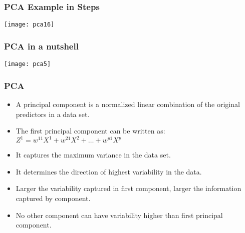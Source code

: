 
\begin{frame}[fragile] \frametitle{PCA Example in Steps} 
\begin{center}
\texttt{[image: pca16]}
\end{center}
\end{frame}



\begin{frame}[fragile] \frametitle{PCA in a nutshell} 
\begin{center}
\texttt{[image: pca5]}
\end{center}
\end{frame}




\begin{frame}[fragile] \frametitle{PCA} 

\begin{itemize}
\item A principal component is a normalized linear combination of the original predictors in a data set.
\item The first principal component can be written as:
$Z^1 = w^{11}X^1 + w^{21}X^2 + \ldots +  w^{p1}X^p$
\item It captures the maximum variance in the data set. 
\item It determines the direction of highest variability in the data. 
\item Larger the variability captured in first component, larger the information captured by component. 
\item No other component can have variability higher than first principal component.
\end{itemize}
\end{frame}

